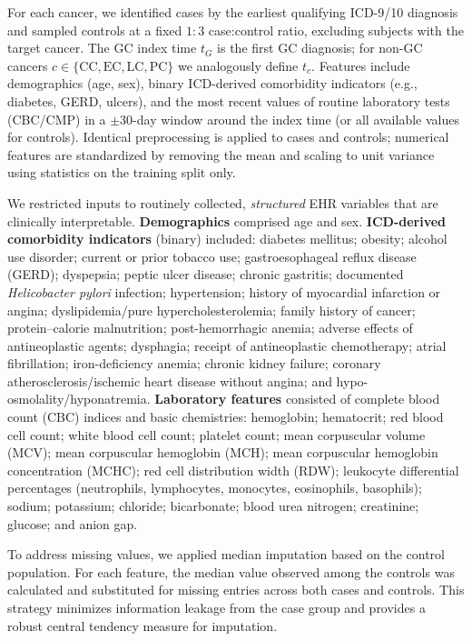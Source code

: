 \documentclass[diagnostics,article,submit,pdftex,moreauthors]{Definitions/mdpi}
\begin{document}
For each cancer, we identified cases by the earliest qualifying ICD-9/10 diagnosis and sampled controls at a fixed $1{:}3$ case:control ratio, excluding subjects with the target cancer.
The GC index time $t_G$ is the first GC diagnosis; for non-GC cancers $c\in\{\mathrm{CC},\mathrm{EC},\mathrm{LC},\mathrm{PC}\}$ we analogously define $t_c$.
Features include demographics (age, sex), binary ICD-derived comorbidity indicators (e.g., diabetes, GERD, ulcers), and the most recent values of routine laboratory tests (CBC/CMP) in a $\pm 30$-day window around the index time (or all available values for controls).
Identical preprocessing is applied to cases and controls; numerical features are standardized by removing the mean and scaling to unit variance using statistics on the training split only.

We restricted inputs to routinely collected, \textit{structured} EHR variables that are clinically interpretable. 
\textbf{Demographics} comprised age and sex. 
\textbf{ICD-derived comorbidity indicators} (binary) included: diabetes mellitus; obesity; alcohol use disorder; current or prior tobacco use; gastroesophageal reflux disease (GERD); dyspepsia; peptic ulcer disease; chronic gastritis; documented \textit{Helicobacter pylori} infection; hypertension; history of myocardial infarction or angina; dyslipidemia/pure hypercholesterolemia; family history of cancer; protein–calorie malnutrition; post-hemorrhagic anemia; adverse effects of antineoplastic agents; dysphagia; receipt of antineoplastic chemotherapy; atrial fibrillation; iron-deficiency anemia; chronic kidney failure; coronary atherosclerosis/ischemic heart disease without angina; and hypo-osmolality/hyponatremia. 
\textbf{Laboratory features} consisted of complete blood count (CBC) indices and basic chemistries: hemoglobin; hematocrit; red blood cell count; white blood cell count; platelet count; mean corpuscular volume (MCV); mean corpuscular hemoglobin (MCH); mean corpuscular hemoglobin concentration (MCHC); red cell distribution width (RDW); leukocyte differential percentages (neutrophils, lymphocytes, monocytes, eosinophils, basophils); sodium; potassium; chloride; bicarbonate; blood urea nitrogen; creatinine; glucose; and anion gap. 

To address missing values, we applied median imputation based on the control population. 
For each feature, the median value observed among the controls was calculated and substituted for missing entries across both cases and controls. 
This strategy minimizes information leakage from the case group and provides a robust central tendency measure for imputation.
\end{document}
